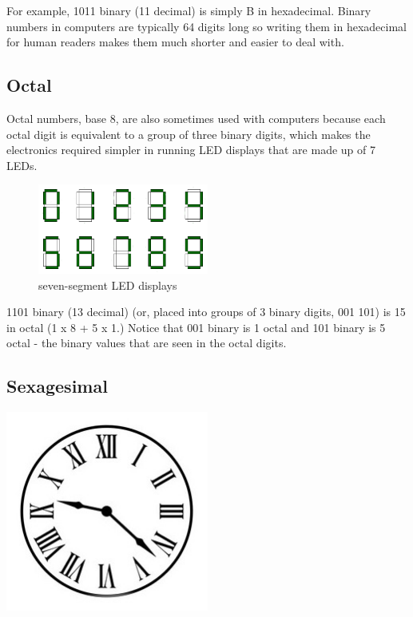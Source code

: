 \documentclass{article}
\begin{document}
For example, 1011 binary (11 decimal) is simply B in hexadecimal. Binary numbers in computers are typically 64 digits long so writing them in hexadecimal for human readers makes them much shorter and easier to deal with.\\

\newpage

\subsection*{Octal}
Octal numbers, base 8, are also sometimes used with computers because each octal digit is equivalent to a group of three binary digits, which makes the electronics required simpler in running LED displays that are made up of 7 LEDs.\\

\begin{figure}[ht]
\centering
\includegraphics[width=0.5\textwidth]{7segment}
\caption*{seven-segment LED displays}
\end{figure}

1101 binary (13 decimal) (or, placed into groups of 3 binary digits, 001 101) is 15 in octal (1 x 8 + 5 x 1.) Notice that 001 binary is 1 octal and 101 binary is 5 octal - the binary values that are seen in the octal digits.\\

\newpage

\subsection*{Sexagesimal}

\begin{center}
\includegraphics[width=0.5\textwidth]{old-fashion-vintage-clock-face}
\end{center}
\end{document}
